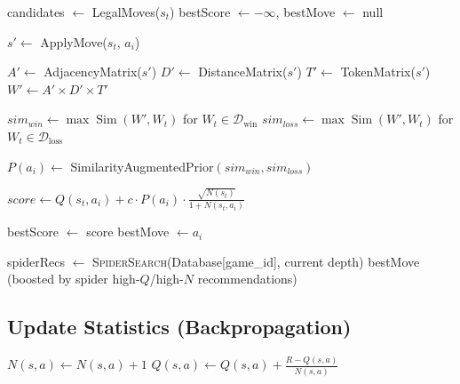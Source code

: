 \documentclass[11pt,a4paper]{article}
\theoremstyle{plain}
\theoremstyle{definition}
\begin{document}
\begin{algorithm}[H]
\caption{MCVS Move Selection}
\label{alg:mcvs_select}
\begin{algorithmic}[1]
    \State candidates $\gets$ LegalMoves($s_t$)
    \State bestScore $\gets -\infty$, bestMove $\gets$ null
    
        \State $s' \gets$ ApplyMove($s_t$, $a_i$)
        
        \State {}
        \State $A' \gets$ AdjacencyMatrix($s'$)
        \State $D' \gets$ DistanceMatrix($s'$)
        \State $T' \gets$ TokenMatrix($s'$)
        \State $W' \gets A' \times D' \times T'$
        
        \State $sim_{win} \gets \max \operatorname{Sim}(W', W_t)$ \quad for $W_t \in \mathcal{D}_{\text{win}}$
        \State $sim_{loss} \gets \max \operatorname{Sim}(W', W_t)$ \quad for $W_t \in \mathcal{D}_{\text{loss}}$
        
        \State $P(a_i) \gets$ SimilarityAugmentedPrior$(sim_{win}, sim_{loss})$
        
        \State $score \gets Q(s_t, a_i) + c \cdot P(a_i) \cdot \frac{\sqrt{N(s_t)}}{1 + N(s_t, a_i)}$
        
            \State bestScore $\gets$ score
            \State bestMove $\gets a_i$
        \EndIf
    \EndFor
    
    \State spiderRecs $\gets$ \textsc{SpiderSearch}(Database[game\_id], current depth)
    \State \Return bestMove (boosted by spider high-$Q$/high-$N$ recommendations)
\EndProcedure
\end{algorithmic}
\end{algorithm}

\vspace{0.5em}

\subsection{Update Statistics (Backpropagation)}

\vspace{0.5em}

\begin{algorithm}[H]
\caption{Update Q and N (Backpropagation)}
\label{alg:update_statistics}
\begin{algorithmic}[1]
        \State $N(s,a) \gets N(s,a) + 1$
        \State $Q(s,a) \gets Q(s,a) + \frac{R - Q(s,a)}{N(s,a)}$
    \EndFor
\EndProcedure
\end{algorithmic}
\end{algorithm}
\end{document}
